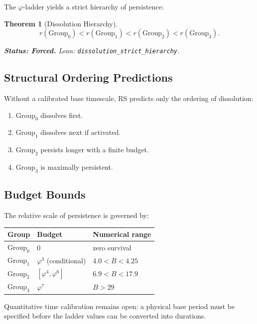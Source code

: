 \documentclass[11pt,a4paper]{article}
\newtheorem{theorem}{Theorem}[section]
\theoremstyle{definition}
\newcommand{\phig}{\varphi}
\newcommand{\code}[1]{\texttt{\small #1}}
\newcommand{\forced}[1]{\noindent\textbf{Status: Forced.} #1}
\begin{document}
The $\phig$-ladder yields a strict hierarchy of persistence:

\begin{theorem}[Dissolution Hierarchy]
\label{thm:hierarchy}
\[
  r(\mathrm{Group}_0) < r(\mathrm{Group}_1) <
  r(\mathrm{Group}_2) < r(\mathrm{Group}_3).
\]

\forced{Lean: \code{dissolution\_strict\_hierarchy}.}
\end{theorem}

\subsection{Structural Ordering Predictions}

Without a calibrated base timescale, RS predicts only the ordering of
dissolution:
\begin{enumerate}
\item $\mathrm{Group}_0$ dissolves first.
\item $\mathrm{Group}_1$ dissolves next if activated.
\item $\mathrm{Group}_2$ persists longer with a finite budget.
\item $\mathrm{Group}_3$ is maximally persistent.
\end{enumerate}

\subsection{Budget Bounds}

The relative scale of persistence is governed by:
\begin{center}
\small
\begin{tabular}{lll}
\toprule
\textbf{Group} & \textbf{Budget} & \textbf{Numerical range} \\
\midrule
$\mathrm{Group}_0$ & $0$ & zero survival \\
$\mathrm{Group}_1$ & $\phig^3$ (conditional) & $4.0 < B < 4.25$ \\
$\mathrm{Group}_2$ & $[\phig^4,\phig^6]$ & $6.9 < B < 17.9$ \\
$\mathrm{Group}_3$ & $\phig^7$ & $B > 29$ \\
\bottomrule
\end{tabular}
\end{center}

Quantitative time calibration remains open: a physical base period must
be specified before the ladder values can be converted into durations.

\end{document}
